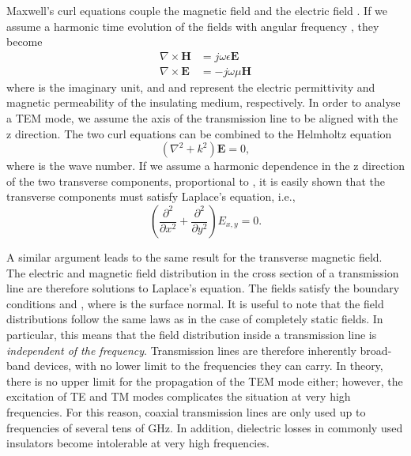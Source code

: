 Maxwell's curl equations couple the magnetic field  and
the electric field . If we assume a harmonic time
evolution of the fields with angular frequency \m{\omega}, they become
%
\begin{eqnarray}
\nabla \times \mathbf{H} &= j \omega \epsilon \mathbf{E} \\
\nabla \times \mathbf{E} &= - j\omega \mu \mathbf{H}
\end{eqnarray}
%
where  is the imaginary unit, and \m{\epsilon} and
\m{\mu} represent the electric permittivity and magnetic permeability of
the insulating medium, respectively. In order to analyse a TEM mode, we
assume the axis of the transmission line to be aligned with the z
direction. The two curl equations can be combined to the Helmholtz
equation
%
\begin{equation}
(\nabla^2+k^2) \mathbf{E}  =0,
\end{equation}
%
where  is the wave number. If we assume a
harmonic dependence in the z direction of the two transverse components,
proportional to , it is easily shown that the transverse
components must satisfy Laplace's equation, i.e.,
%
\begin{equation}
\left(\frac{\partial^2}{\partial x^2}+ \frac{\partial^2}{\partial y^2}\right) E_{x,y} = 0.
\end{equation}

A similar argument leads to the same result for the transverse magnetic
field. The electric and magnetic field distribution in the cross section
of a transmission line are therefore solutions to Laplace's equation.
The fields satisfy the boundary conditions
 and ,
where  is the surface normal. It is useful to note that
the field distributions follow the same laws as in the case of
completely static fields. In particular, this means that the field
distribution inside a transmission line is
\textit{independent of the frequency}. Transmission lines are therefore
inherently broad-band devices, with no lower limit to the frequencies
they can carry. In theory, there is no upper limit for the propagation
of the TEM mode either; however, the excitation of TE and TM modes
complicates the situation at very high frequencies. For this reason,
coaxial transmission lines are only used up to frequencies of several
tens of GHz. In addition, dielectric losses in commonly used insulators
become intolerable at very high frequencies. 

